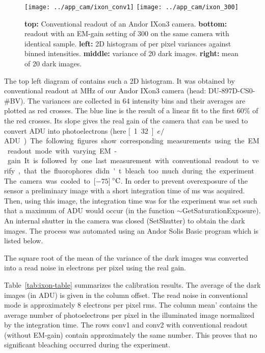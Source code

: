 \begin{figure}
  \centering
  \texttt{[image: ../app\_cam/ixon\_conv1]}
  \texttt{[image: ../app\_cam/ixon\_300]}
  \caption{{\bf top:} Conventional readout of an Andor IXon3
    camera. {\bf bottom:} readout with an EM-gain setting of 300 on
    the same camera with identical sample. {\bf left:} 2D histogram of
    per pixel variances against binned intensities. {\bf middle:}
    variance of 20 dark images. {\bf right:} mean of 20 dark images.}
  \label{fig:ixon}
\end{figure}
  
The top left diagram of  contains such a 2D
histogram. It was obtained by conventional readout at \unit[3]{MHz} of
our Andor IXon3 camera (head: DU-897D-CS0-\#BV). The variances are
collected in 64 intensity bins and their averages are plotted as red
crosses. The blue line is the result of a linear fit to the first
$60\%$ of the red crosses. Its slope gives the real gain of the camera
that can be used to convert ADU into photoelectrons (here
\unit[1.32]{$e/$ADU}).

The following figures show corresponding measurements using the EM
readout mode with varying EM-gain. It is followed by one last
measurement with conventional readout to verify, that the fluorophores
didn't bleach too much during the experiment.

The camera was cooled to \unit[$-75$]{$\,^{\circ}{\rm C}$}. In order
to prevent overexposure of the sensor a preliminary image with a short
integration time of \unit[10]{ms} was acquired. Then, using this
image, the integration time was for the experiment was set such that a
maximum of \unit[10000]{ADU} would occur (in the function
\textsf{$\sim$GetSaturationExposure}). An internal shutter in the camera
was closed (\textsf{SetShutter}) to obtain the dark images. The process
was automated using an Andor Solis Basic program which is listed
below.


The square root of the mean of the variance of the dark images was
converted into a read noise in electrons per pixel using the real
gain.

Table~\ref{tab:ixon-table} summarizes the calibration results. The
average of the dark images (in ADU) is given in the column
\textsf{offset}. The read noise in conventional mode is approximately
8 electrons per pixel rms. The column \textsf{mean'} contains the
average number of photoelectrons per pixel in the illuminated image
normalized by the integration time. The rows \textsf{conv1} and
\textsf{conv2} with conventional readout (without EM-gain) contain
approximately the same number. This proves that no significant
bleaching occurred during the experiment.

